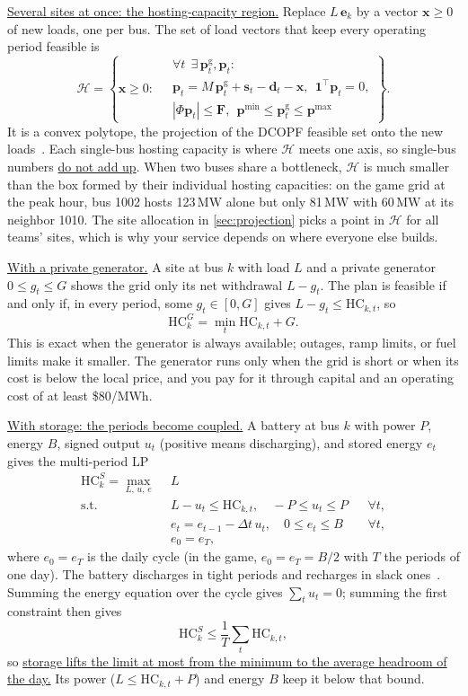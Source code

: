 \documentclass[10pt]{article}
\newcommand{\alert}[1]{{\color{alertblue}\uline{#1}}}
\newcommand{\MW}{\ensuremath{\,\mathrm{MW}}}
\begin{document}
\alert{Several sites at once: the hosting-capacity region.} Replace
$L\,\mathbf e_k$ by a vector $\mathbf x \ge 0$ of new loads, one per bus. The
set of load vectors that keep every operating period feasible is
\[
  \mathcal H = \left\{ \mathbf x \ge 0 :\
  \begin{aligned}
    &\forall t\ \ \exists\, \mathbf p^{\mathrm g}_t, \mathbf p_t:\\
    &\mathbf p_t = M\,\mathbf p^{\mathrm g}_t + \mathbf s_t - \mathbf d_t - \mathbf x,\ \
     \mathbf 1^{\top} \mathbf p_t = 0,\\
    &|\Phi \mathbf p_t| \le \mathbf F,\ \
     \mathbf p^{\min} \le \mathbf p^{\mathrm g}_t \le \mathbf p^{\max}
  \end{aligned}\right\}.
\]
It is a convex polytope, the projection of the DCOPF feasible set onto the new
loads~\cite{gong2024adaptive}. Each single-bus hosting capacity is where
$\mathcal H$ meets one axis, so single-bus numbers \alert{do not add up}. When
two buses share a bottleneck, $\mathcal H$ is much smaller than the box formed
by their individual hosting capacities: on the game grid at the peak hour, bus
1002 hosts 123\MW{} alone but only 81\MW{} with 60\MW{} at its neighbor 1010.
The site allocation in \cref{sec:projection} picks a point in $\mathcal H$ for
all teams' sites, which is why your service depends on where everyone else
builds.

\alert{With a private generator.} A site at bus $k$ with load $L$ and a
private generator $0 \le g_t \le G$ shows the grid only its net
withdrawal $L - g_t$. The plan is feasible if and only if, in every period,
some $g_t \in [0, G]$ gives $L - g_t \le \mathrm{HC}_{k,t}$, so
\[
  \mathrm{HC}^{G}_k = \min_t \mathrm{HC}_{k,t} + G .
\]
This is exact when the generator is always available; outages, ramp limits, or
fuel limits make it smaller. The generator runs only when the grid is short or
when its cost is below the local price, and you pay for it through capital and
an operating cost of at least \$80/MWh.

\alert{With storage: the periods become coupled.} A battery at bus $k$ with
power $P$, energy $B$, signed output $u_t$ (positive means discharging), and
stored energy $e_t$ gives the multi-period LP
\begin{align*}
  \mathrm{HC}^{S}_k = \max_{L,\,u,\,e}\ \ & L\\
  \text{s.t.}\ \ & L - u_t \le \mathrm{HC}_{k,t},\quad -P \le u_t \le P && \forall t,\\
  & e_t = e_{t-1} - \Delta t\, u_t,\quad 0 \le e_t \le B && \forall t,\\
  & e_0 = e_T ,
\end{align*}
where $e_0 = e_T$ is the daily cycle (in the game, $e_0 = e_T = B/2$ with
$T$ the periods of one day). The battery discharges in tight periods and
recharges in slack ones~\cite{macedo2017increasing}. Summing the energy
equation over the cycle gives $\sum_t u_t = 0$; summing the first constraint
then gives
\[
  \mathrm{HC}^{S}_k \le \frac1T \sum_t \mathrm{HC}_{k,t},
\]
so \alert{storage lifts the limit at most from the minimum to the
average headroom of the day.} Its power ($L \le \mathrm{HC}_{k,t} + P$)
and energy $B$ keep it below that bound.
\end{document}
